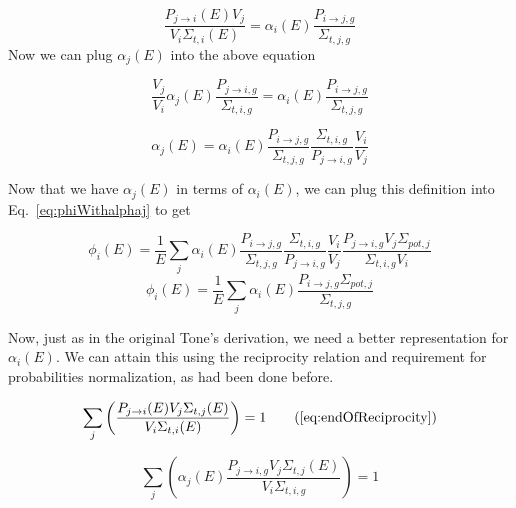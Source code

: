 \documentclass[10pt]{article}
\begin{document}
\begin{equation}\frac{P_{j\rightarrow i}(E)V_{j}}{V_{i}\Sigma_{t,i}(E)}=\alpha_{i}(E)\frac{P_{i\rightarrow j,g}}{\Sigma_{t,j,g}}\end{equation}
  Now we can plug $\alpha_j(E)$ into the above equation

\begin{equation}\frac{V_{j}}{V_{i}}\alpha_{j}(E)\frac{P_{j\rightarrow i,g}}{\Sigma_{t,i,g}}=\alpha_{i}(E)\frac{P_{i\rightarrow j,g}}{\Sigma_{t,j,g}}\end{equation}
  
\begin{equation}\alpha_{j}(E)=\alpha_{i}(E)\frac{P_{i\rightarrow j,g}}{\Sigma_{t,j,g}}\frac{\Sigma_{t,i,g}}{P_{j\rightarrow i,g}}\frac{V_{i}}{V_{j}}\end{equation}

  Now that we have $\alpha_j(E)$ in terms of $\alpha_i(E)$, we can plug this definition into Eq.~\ref{eq:phiWithalphaj} to get 

\begin{equation}\phi_{i}(E)=\frac{1}{E}\sum\limits_j\alpha_{i}(E)\frac{P_{i\rightarrow j,g}}{\Sigma_{t,j,g}}\frac{\Sigma_{t,i,g}}{P_{j\rightarrow i,g}}\frac{V_{i}}{V_{j}}\frac{P_{j\rightarrow i,g}V_{j}\Sigma_{pot,j}}{\Sigma_{t,i,g}V_{i}}\end{equation}
  \begin{equation}\phi_{i}(E)=\frac{1}{E}\sum\limits_j\alpha_{i}(E)\frac{P_{i\rightarrow j,g}\Sigma_{pot,j}}{\Sigma_{t,j,g}}\label{eq:again}\end{equation}


Now, just as in the original Tone's derivation, we need a better representation for $\alpha_i(E)$. We can attain this using the reciprocity relation and requirement for probabilities normalization, as had been done before.

  \begin{equation}\sum\limits_{j}\left(\frac{P_{j\rightarrow i}(E)V_{j}\Sigma_{t,j}(E)}{V_{i}\Sigma_{t,i}(E)}\right)=1\tag{\ref{eq:endOfReciprocity}}\end{equation}

    
    \begin{equation}\sum\limits_{j}\left(\alpha_j(E)\frac{P_{j\rightarrow i,g}V_{j}\Sigma_{t,j}(E)}{V_{i}\Sigma_{t,i,g}}\right)=1\end{equation}
\end{document}
